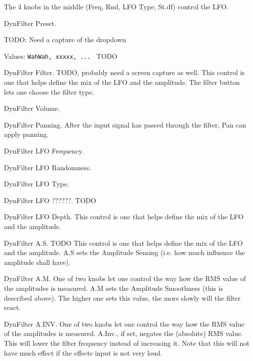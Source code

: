    The 4 knobs in the middle (Freq, Rnd, LFO Type, St.df) control the LFO.

   \setcounter{ItemCounter}{0}      %

      DynFilter Preset.

   TODO:  Need a capture of the dropdown

   Values: \texttt{WahWah, xxxxx, ... } TODO

   DynFilter Filter.  TODO, probably need a screen capture as well.
   This control is one that helps define the mix of the LFO and the
   amplitude.  The filter button lets one choose the filter type.

   DynFilter Volume.

   DynFilter Panning.
   After the input signal has passed through the filter, Pan can apply
   panning.

   DynFilter LFO Frequency.

   DynFilter LFO Randomness.

   DynFilter LFO Type.

   DynFilter LFO ??????.  TODO

   DynFilter LFO Depth.
   This control is one that helps define the mix of the LFO and the
   amplitude.

   DynFilter A.S. TODO
   This control is one that helps define the mix of the LFO and the
   amplitude.
   A.S sets the Amplitude Sensing (i.e. how much influence the amplitude
   shall have).

   DynFilter A.M.
   One of two knobs let one control the way how the RMS value of the
   amplitudes is measured.
   A.M sets the Amplitude Smoothness (this is described above). The higher
   one sets this value, the more slowly will the filter react.

   DynFilter A.INV.  One of two knobs let one control the way how the RMS
   value of the amplitudes is measured.  A.Inv., if set, negates the
   (absolute) RMS value. This will lower the filter frequency instead of
   increasing it. Note that this will not have much effect if the effects
   input is not very loud.

